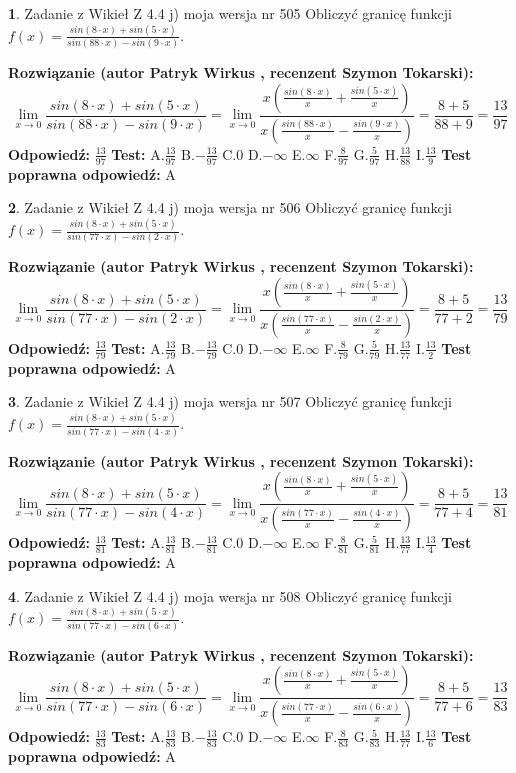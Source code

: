 \documentclass[12pt, a4paper]{article}
\theoremstyle{definition} %
\newtheorem{zad}{}
\newcommand{\zadStart}[1]{\begin{zad}#1\newline}
\newcommand{\zadStop}{\end{zad}}
\newcommand{\rozwStart}[2]{\noindent \textbf{Rozwiązanie (autor #1 , recenzent #2): }\newline}
\newcommand{\rozwStop}{\newline}
\newcommand{\odpStart}{\noindent \textbf{Odpowiedź:}\newline}
\newcommand{\odpStop}{\newline}
\newcommand{\testStart}{\noindent \textbf{Test:}\newline}
\newcommand{\testStop}{\newline}
\newcommand{\kluczStart}{\noindent \textbf{Test poprawna odpowiedź:}\newline}
\newcommand{\kluczStop}{\newline}
\begin{document}
\zadStart{Zadanie z Wikieł Z 4.4 j) moja wersja nr 505}
Obliczyć granicę funkcji $f(x)=\frac{sin(8\cdot x) +sin(5\cdot x)}{sin(88\cdot x) -sin(9\cdot x)}$.
\zadStop
\rozwStart{Patryk Wirkus}{Szymon Tokarski}
$$\lim\limits_{x\to 0}\frac{sin(8\cdot x) +sin(5\cdot x)}{sin(88\cdot x) -sin(9\cdot x)}=\lim\limits_{x\to 0}\frac{x(\frac{sin(8\cdot x)}{x}+\frac{sin(5\cdot x)}{x})}{x(\frac{sin(88\cdot x)}{x}-\frac{sin(9\cdot x)}{x})}=\frac{8+5}{88+9} = \frac{13}{97}$$
\rozwStop
\odpStart
$\frac{13}{97}$
\odpStop
\testStart
A.$\frac{13}{97}$
B.$-\frac{13}{97}$
C.$0$
D.$-\infty$
E.$\infty$
F.$\frac{8}{97}$
G.$\frac{5}{97}$
H.$\frac{13}{88}$
I.$\frac{13}{9}$
\testStop
\kluczStart
A
\kluczStop



\zadStart{Zadanie z Wikieł Z 4.4 j) moja wersja nr 506}
Obliczyć granicę funkcji $f(x)=\frac{sin(8\cdot x) +sin(5\cdot x)}{sin(77\cdot x) -sin(2\cdot x)}$.
\zadStop
\rozwStart{Patryk Wirkus}{Szymon Tokarski}
$$\lim\limits_{x\to 0}\frac{sin(8\cdot x) +sin(5\cdot x)}{sin(77\cdot x) -sin(2\cdot x)}=\lim\limits_{x\to 0}\frac{x(\frac{sin(8\cdot x)}{x}+\frac{sin(5\cdot x)}{x})}{x(\frac{sin(77\cdot x)}{x}-\frac{sin(2\cdot x)}{x})}=\frac{8+5}{77+2} = \frac{13}{79}$$
\rozwStop
\odpStart
$\frac{13}{79}$
\odpStop
\testStart
A.$\frac{13}{79}$
B.$-\frac{13}{79}$
C.$0$
D.$-\infty$
E.$\infty$
F.$\frac{8}{79}$
G.$\frac{5}{79}$
H.$\frac{13}{77}$
I.$\frac{13}{2}$
\testStop
\kluczStart
A
\kluczStop



\zadStart{Zadanie z Wikieł Z 4.4 j) moja wersja nr 507}
Obliczyć granicę funkcji $f(x)=\frac{sin(8\cdot x) +sin(5\cdot x)}{sin(77\cdot x) -sin(4\cdot x)}$.
\zadStop
\rozwStart{Patryk Wirkus}{Szymon Tokarski}
$$\lim\limits_{x\to 0}\frac{sin(8\cdot x) +sin(5\cdot x)}{sin(77\cdot x) -sin(4\cdot x)}=\lim\limits_{x\to 0}\frac{x(\frac{sin(8\cdot x)}{x}+\frac{sin(5\cdot x)}{x})}{x(\frac{sin(77\cdot x)}{x}-\frac{sin(4\cdot x)}{x})}=\frac{8+5}{77+4} = \frac{13}{81}$$
\rozwStop
\odpStart
$\frac{13}{81}$
\odpStop
\testStart
A.$\frac{13}{81}$
B.$-\frac{13}{81}$
C.$0$
D.$-\infty$
E.$\infty$
F.$\frac{8}{81}$
G.$\frac{5}{81}$
H.$\frac{13}{77}$
I.$\frac{13}{4}$
\testStop
\kluczStart
A
\kluczStop



\zadStart{Zadanie z Wikieł Z 4.4 j) moja wersja nr 508}
Obliczyć granicę funkcji $f(x)=\frac{sin(8\cdot x) +sin(5\cdot x)}{sin(77\cdot x) -sin(6\cdot x)}$.
\zadStop
\rozwStart{Patryk Wirkus}{Szymon Tokarski}
$$\lim\limits_{x\to 0}\frac{sin(8\cdot x) +sin(5\cdot x)}{sin(77\cdot x) -sin(6\cdot x)}=\lim\limits_{x\to 0}\frac{x(\frac{sin(8\cdot x)}{x}+\frac{sin(5\cdot x)}{x})}{x(\frac{sin(77\cdot x)}{x}-\frac{sin(6\cdot x)}{x})}=\frac{8+5}{77+6} = \frac{13}{83}$$
\rozwStop
\odpStart
$\frac{13}{83}$
\odpStop
\testStart
A.$\frac{13}{83}$
B.$-\frac{13}{83}$
C.$0$
D.$-\infty$
E.$\infty$
F.$\frac{8}{83}$
G.$\frac{5}{83}$
H.$\frac{13}{77}$
I.$\frac{13}{6}$
\testStop
\kluczStart
A
\kluczStop
\end{document}
